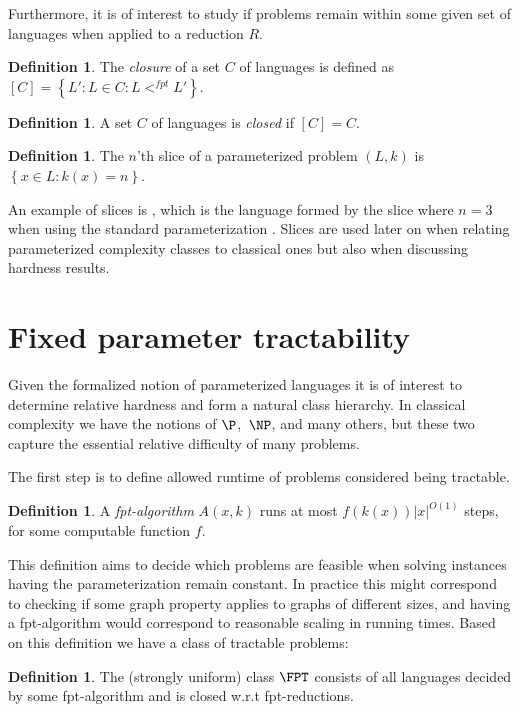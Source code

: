 \documentclass[a4paper,11pt]{report}
\theoremstyle{plain}
\theoremstyle{definition}
\newtheorem{defn}[thm]{Definition} %
\begin{document}
Furthermore, it is of interest to study if problems remain within some given set of languages when applied to a reduction $R$.

\begin{defn}
The \emph{closure} of a set $C$ of languages is defined as $\left[ C \right] = \left\{ L' : L \in C : L <^{fpt} L'\right\}$.
\end{defn}

\begin{defn}
A set $C$ of languages is \emph{closed} if $\left[ C \right] = C$.
\end{defn}

\begin{defn}
The $n$'th slice of a parameterized problem $(L, k)$ is $\left\{ x \in L : k(x) = n \right\}$.
\end{defn}

An example of slices is , which is the language formed by the slice where $n = 3$ when using the standard parameterization .
Slices are used later on when relating parameterized complexity classes to classical ones but also when discussing hardness results.

\section{Fixed parameter tractability}
Given the formalized notion of parameterized languages it is of interest to determine relative hardness and form a natural class hierarchy.
In classical complexity we have the notions of $\P$, $\NP$, and many others, but these two capture the essential relative difficulty of many problems.

The first step is to define allowed runtime of problems considered being tractable.

\begin{defn}
A \emph{fpt-algorithm} $A(x, k)$ runs at most $f(k(x)) |x|^{O(1)}$ steps, for some computable function $f$.
\end{defn}

This definition aims to decide which problems are feasible when solving instances having the parameterization remain constant.
In practice this might correspond to checking if some graph property applies to graphs of different sizes, and having a fpt-algorithm
would correspond to reasonable scaling in running times.
Based on this definition we have a class of tractable problems:

\begin{defn}
The (strongly uniform) class $\FPT$ consists of all languages decided by some fpt-algorithm and is closed w.r.t fpt-reductions.
\end{defn}
\end{document}
